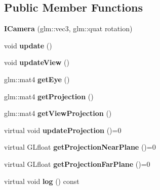 \subsection*{Public Member Functions}
\begin{DoxyCompactItemize}
\item 
\mbox{\label{classflw_1_1flf_1_1ICamera_a3a28d3603bc703fc2abf412f30e17cde}} 
{\bfseries I\+Camera} (glm\+::vec3, glm\+::quat rotation)
\item 
\mbox{\label{classflw_1_1flf_1_1ICamera_a9fcc6a75bb0f49d7308396eec9105a89}} 
void {\bfseries update} ()
\item 
\mbox{\label{classflw_1_1flf_1_1ICamera_a364eb58aa13b0ac004cdfd0c270d9b5a}} 
void {\bfseries update\+View} ()
\item 
\mbox{\label{classflw_1_1flf_1_1ICamera_a13edf1c6809a1d64fda00ac05c3e26b6}} 
glm\+::mat4 {\bfseries get\+Eye} ()
\item 
\mbox{\label{classflw_1_1flf_1_1ICamera_a2dd407fba655d57f74f2cba0de9ec978}} 
glm\+::mat4 {\bfseries get\+Projection} ()
\item 
\mbox{\label{classflw_1_1flf_1_1ICamera_a8af0d020d8a6a10a68f65162806c8a98}} 
glm\+::mat4 {\bfseries get\+View\+Projection} ()
\item 
\mbox{\label{classflw_1_1flf_1_1ICamera_a16c68d1fa6e5f7159a14c6aa018d1a84}} 
virtual void {\bfseries update\+Projection} ()=0
\item 
\mbox{\label{classflw_1_1flf_1_1ICamera_aa6edd27ce33e246e70b946c1267406d6}} 
virtual G\+Lfloat {\bfseries get\+Projection\+Near\+Plane} ()=0
\item 
\mbox{\label{classflw_1_1flf_1_1ICamera_a702a10b338e2612e673538d7f61ef289}} 
virtual G\+Lfloat {\bfseries get\+Projection\+Far\+Plane} ()=0
\item 
\mbox{\label{classflw_1_1flf_1_1ICamera_ae7d388dbed85e70473f3d0b59798d3b4}} 
virtual void {\bfseries log} () const
\end{DoxyCompactItemize}
